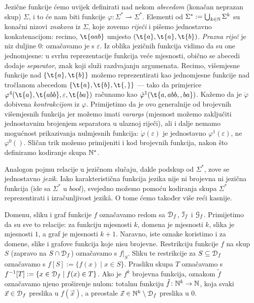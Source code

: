 Jezične funkcije ćemo uvijek definirati nad nekom \emph{abecedom} (konačan neprazan skup) $\Sigma$, i to će nam biti funkcije $\varphi\colon\Sigma^*\rightharpoonup\Sigma^*$. Elementi od $\Sigma^*:=\bigcup_{k\in{\mathbb N}}\Sigma^k$ su konačni nizovi \emph{znakova} iz $\Sigma$, koje zovemo \emph{riječi} i pišemo jednostavno konkatenacijom: recimo, $\t{aab}$ umjesto $(\t{a},\t{a},\t{b})$. \emph{Prazna riječ} je niz duljine $0$: označavamo je s $\varepsilon$. Iz oblika jezičnih funkcija vidimo da su one jednomjesne: u svrhu reprezentacije funkcija veće mjesnosti, obično se abecedi dodaje \emph{separator}, znak koji služi razdvajanju argumenata. Recimo, višemjesne funkcije nad $\{\t{a},\t{b}\}$ možemo reprezentirati kao jednomjesne funkcije nad tročlanom abecedom $\{\t{a},\t{b},\t{,}\}$ --- tako da primjerice $\varphi^4(\t{a},\t{abb},\varepsilon,\t{ba})$ računamo kao $\dot\varphi^1(\t{a{},{}a{}b{}b{},{},{}b{}a})$. Kažemo da je $\dot\varphi$ dobivena \emph{kontrakcijom} iz $\varphi$.
Primijetimo da je ovo generalnije od brojevnih višemjesnih funkcija jer možemo imati \emph{varargs} (mjesnost možemo zaključiti jednostavnim brojenjem separatora u ulaznoj ri\-je\-či), ali i dalje nemamo mogućnost prikazivanja nulmjesnih funkcija: $\dot\varphi(\varepsilon)$ je jednostavno $\varphi^1(\varepsilon)$, ne $\varphi^0()$. Sličan trik možemo primijeniti i kod brojevnih funkcija, nakon što definiramo kodiranje skupa ${\mathbb N}^*$.

Analogon pojmu relacije u jezičnom slučaju, dakle podskup od $\Sigma^*$, zove se jednostavno \emph{jezik}. Iako karakteristična funkcija jezika nije ni brojevna ni jezična funkcija (ide sa $\Sigma^*$ u $bool$), svejedno možemo pomoću kodiranja skupa $\Sigma^*$ reprezentirati i izračunljivost jezikâ. O tome ćemo također više reći kasnije.

Domenu, sliku i graf funkcije $f$ označavamo redom sa $\mathcal D_{f}$, $\mathcal I_{f}$ i $\mathcal G_{f}$. Primijetimo da su sve to relacije: za funkciju mjesnosti $k$, domena je mjesnosti $k$, slika je mjesnosti $1$, a graf je mjesnosti $k+1$. Naravno, iste oznake koristimo i za domene, slike i grafove funkcija koje nisu brojevne. Restrikciju funkcije $f$ na skup $S$ (zapravo na $S\cap\mathcal D_{f}$) označavamo s $f|_S$. Sliku te restrikcije za $S\subseteq\mathcal D_{f}$ označavamo s $f[S]:=\{f(x)\mid x\in S\}$. Prasliku skupa $T$ označavamo s $f^{-1}[T]:=\{x\in\mathcal D_{f}\mid f(x)\in T\}$. Ako je $f^k$ brojevna funkcija, oznakom $\tilde f$ označavamo njeno proširenje nulom: totalnu funkciju $\tilde{f}\colon{\mathbb N}^k\to{\mathbb N}$, koja svaki $\vec x\in\mathcal D_{f}$ preslika u $f(\vec x)$, a preostale $\vec x\in{\mathbb N}^k\setminus\mathcal D_{f}$ preslika u $0$.

